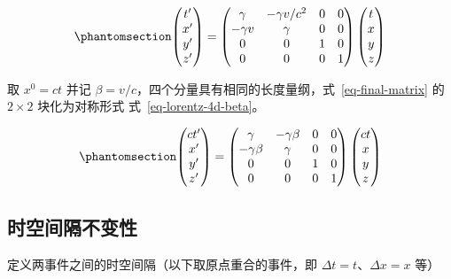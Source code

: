\documentclass[
  chinese,
  a4paper,
  UTF8,
  12pt,
  oneside,
  openany]{ctexbook}
\theoremstyle{plain}
\theoremstyle{plain}
\theoremstyle{plain}
\theoremstyle{definition}
\theoremstyle{plain}
\theoremstyle{plain}
\theoremstyle{remark}
\begin{document}
\begin{equation}\protect\phantomsection\label{eq-lorentz-4d-mat}{
\begin{pmatrix}
t' \\ x' \\ y' \\ z'
\end{pmatrix}
=
\begin{pmatrix}
\gamma & -\gamma v/c^{2} & 0 & 0 \\
-\gamma v & \gamma & 0 & 0 \\
0 & 0 & 1 & 0 \\
0 & 0 & 0 & 1
\end{pmatrix}
\begin{pmatrix}
t \\ x \\ y \\ z
\end{pmatrix}
}\end{equation}

取 \(x^{0} = ct\) 并记
\(\beta = v/c\)，四个分量具有相同的长度量纲，式~\ref{eq-final-matrix} 的
\(2 \times 2\) 块化为对称形式 式~\ref{eq-lorentz-4d-beta}。

\begin{equation}\protect\phantomsection\label{eq-lorentz-4d-beta}{
\begin{pmatrix}
ct' \\ x' \\ y' \\ z'
\end{pmatrix}
=
\begin{pmatrix}
\gamma & -\gamma\beta & 0 & 0 \\
-\gamma\beta & \gamma & 0 & 0 \\
0 & 0 & 1 & 0 \\
0 & 0 & 0 & 1
\end{pmatrix}
\begin{pmatrix}
ct \\ x \\ y \\ z
\end{pmatrix}
}\end{equation}

\subsection{时空间隔不变性}\label{ux65f6ux7a7aux95f4ux9694ux4e0dux53d8ux6027}

定义两事件之间的时空间隔（以下取原点重合的事件，即
\(\Delta t = t\)、\(\Delta x = x\) 等）
\end{document}
